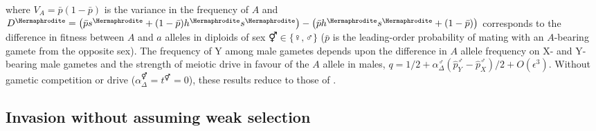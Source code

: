 \documentclass[12pt]{article}
\begin{document}
\noindent
where $V_{A}=\bar{p}(1-\bar{p})$ is the variance in the frequency of $A$ and $D^\Hermaphrodite=\big{(} \bar{p}s^\Hermaphrodite+(1-\bar{p})h^\Hermaphrodite s^\Hermaphrodite\big{)} -\big{(} \bar{p}h^\Hermaphrodite s^\Hermaphrodite+(1-\bar{p}) \big{)}$ corresponds to the difference in fitness between $A$ and $a$ alleles in diploids of sex $\Hermaphrodite \in \{\female,\male\}$ ($\bar{p}$ is the leading-order probability of mating with an $A$-bearing gamete from the opposite sex). 
The frequency of Y among male gametes depends upon the difference in $A$ allele frequency on X- and Y-bearing male gametes and the strength of meiotic drive in favour of the $A$ allele in males, $q=1/2+\alpha_{\Delta}^\male(\hat{p}^\male_Y-\hat{p}^\male_X)/2+O(\epsilon^3)$.
Without gametic competition or drive ($\alpha_{\Delta}^\Hermaphrodite=t^\Hermaphrodite=0$), these results reduce to those of \citet{vanDoorn:2007eu}.



\subsection*{Invasion without assuming weak selection}
\end{document}

